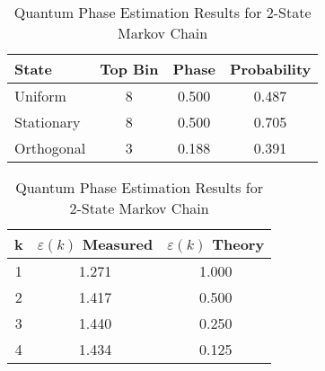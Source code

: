 \begin{table}[h]
\centering
\caption{Quantum Phase Estimation Results for 2-State Markov Chain}
\begin{tabular}{|l|c|c|c|}
\hline
\textbf{State} & \textbf{Top Bin} & \textbf{Phase} & \textbf{Probability} \\
\hline
Uniform & 8 & 0.500 & 0.487 \\
Stationary & 8 & 0.500 & 0.705 \\
Orthogonal & 3 & 0.188 & 0.391 \\
\hline
\end{tabular}

\vspace{1em}

\begin{tabular}{|c|c|c|}
\hline
\textbf{k} & \textbf{$\varepsilon(k)$ Measured} & \textbf{$\varepsilon(k)$ Theory} \\
\hline
1 & 1.271 & 1.000 \\
2 & 1.417 & 0.500 \\
3 & 1.440 & 0.250 \\
4 & 1.434 & 0.125 \\
\hline
\end{tabular}
\label{tab:qpe_results}
\end{table}